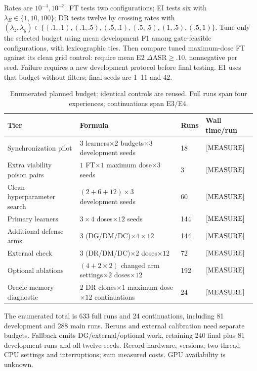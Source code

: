 \documentclass[10pt,a4paper]{article}
\newcommand{\meas}{\textnormal{[MEASURE]}}
\begin{document}
Rates are $10^{-4},10^{-3}$. FT tests two configurations; EI tests six with $\lambda_E\in\{1,10,100\}$; DR tests twelve by crossing rates with $(\lambda_z,\lambda_y)\in\{(.1,.1),(.1,.5),(.5,.1),(.5,.5),(1,.5),(.5,1)\}$. Tune only the selected budget using mean development F1 among gate-feasible configurations, with lexicographic ties. Then compare tuned maximum-dose FT against its clean grid control: require mean E2 $\Delta\mathrm{ASR}\ge.10$, nonnegative per seed. Failure requires a new development protocol before final testing. E1 uses that budget without filters; final seeds are 1--11 and 42.

\begin{table}[htbp]
\centering\footnotesize
\caption{Enumerated planned budget; identical controls are reused. Full runs span four experiences; continuations span E3/E4.}
\label{tab:budget}
\begin{tabularx}{\linewidth}{Y L{4.8cm}L{1.1cm}L{2.5cm}}
\toprule
Tier & Formula & Runs & Wall time/run\\
\midrule
Synchronization pilot & $3$ learners$\times2$ budgets$\times3$ development seeds & 18 & $\meas$\\
Extra viability poison pairs & $1$ FT$\times1$ maximum dose$\times3$ seeds & 3 & $\meas$\\
Clean hyperparameter search & $(2+6+12)\times3$ development seeds & 60 & $\meas$\\
Primary learners & $3\times4$ doses$\times12$ seeds & 144 & $\meas$\\
Additional defense arms & $3$ (DG/DM/DC)$\times4\times12$ & 144 & $\meas$\\
External check & $3$ (DR/DM/DC)$\times2$ doses$\times12$ & 72 & $\meas$\\
Optional ablations & $(4+2\times2)$ changed arm settings$\times2$ doses$\times12$ & 192 & $\meas$\\
Oracle memory diagnostic & $2$ DR clones$\times1$ maximum dose$\times12$ continuations & 24 & $\meas$\\
\bottomrule
\end{tabularx}
\end{table}
The enumerated total is 633 full runs and 24 continuations, including 81 development and 288 main runs. Reruns and external calibration need separate budgets. Fallback omits DG/external/optional work, retaining 240 final plus 81 development runs and all twelve seeds. Record hardware, versions, two-thread CPU settings and interruptions; sum measured costs. GPU availability is unknown.
\end{document}
